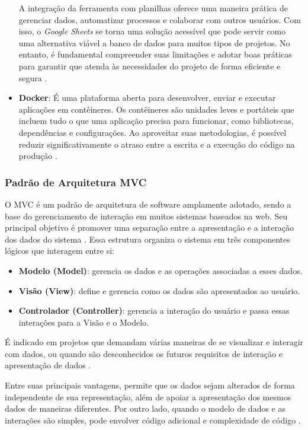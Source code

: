\begin{itemize}
    A integração da ferramenta com planilhas oferece uma maneira prática de gerenciar dados, automatizar processos e colaborar com outros usuários. Com isso, o \textit{Google Sheets} se torna uma solução acessível que pode servir como uma alternativa viável a banco de dados para muitos tipos de projetos. No entanto, é fundamental compreender suas limitações e adotar boas práticas para garantir que atenda às necessidades do projeto de forma eficiente e segura \cite{ufsm2024}.
    
    \item \textbf{Docker}: É uma plataforma aberta para desenvolver, enviar e executar aplicações em contêineres. Os contêineres são unidades leves e portáteis que incluem tudo o que uma aplicação precisa para funcionar, como bibliotecas, dependências e configurações. Ao aproveitar suas metodologias, é possível reduzir significativamente o atraso entre a escrita e a execução do código na produção \cite{docker2025}.
\end{itemize}

\subsubsection{Padrão de Arquitetura MVC}

O MVC é um padrão de arquitetura de software amplamente adotado, sendo a base do gerenciamento de interação em muitos sistemas baseados na web. Seu principal objetivo é promover uma separação entre a apresentação e a interação dos dados do sistema \cite{sommerville2011engenharia}. Essa estrutura organiza o sistema em três componentes lógicos que interagem entre si:

\begin{itemize}
    \item \textbf{Modelo (Model)}: gerencia os dados e as operações associadas a esses dados.
    \item \textbf{Visão (View)}: deﬁne e gerencia como os dados são apresentados ao usuário.
    \item \textbf{Controlador (Controller)}: gerencia a interação do usuário e passa essas interações para a Visão e o Modelo.
\end{itemize}

É indicado em projetos que demandam várias maneiras de se visualizar e interagir com dados, ou quando são desconhecidos os futuros requisitos de interação e apresentação de dados \cite{sommerville2011engenharia}.

Entre suas principais vantagens, permite que os dados sejam alterados de forma independente de sua representação, além de apoiar a apresentação dos mesmos dados de maneiras diferentes. Por outro lado, quando o modelo de dados e as interações são simples, pode envolver código adicional e complexidade de código \cite{sommerville2011engenharia}.

